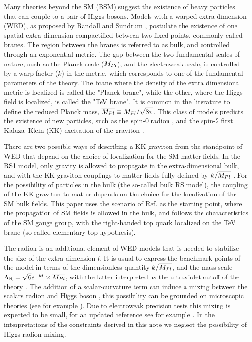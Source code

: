 Many theories beyond the SM (BSM) suggest \ifdefined{}\else{ } \fi the existence of heavy particles that can couple to a pair of Higgs bosons. 
Models with a warped extra dimension 
(WED), as proposed by Randall and Sundrum \cite{Randall:1999ee}, postulate the existence of one spatial extra dimension compactified between two fixed points, commonly called branes. The region between the branes is referred to as bulk, and controlled through an exponential metric. 
The gap between the two fundamental scales of nature, such as the Planck scale ($M_{Pl}$), and the electroweak scale, is controlled by a warp factor ($k$) in the metric, which corresponds to one of the fundamental parameters of  the theory. The brane where the density of the extra dimensional metric is localized is called the "Planck brane", while the other, where the Higgs field is localized, is called the "TeV brane". It is common in the 
literature to define the reduced Planck mass, $\overline{M_{Pl}} \equiv M_{Pl} /\sqrt{8\pi}$. 
This class of models predicts the existence of new particles, such as the spin-0 radion \cite{Goldberger:1999uk,DeWolfe:1999cp,Csaki:1999mp}, and the spin-2 
first Kaluza--Klein (KK) excitation of the graviton \cite{Davoudiasl:1999jd,Csaki:2000zn, Agashe:2007zd}. 

There are two possible ways of describing a KK graviton from the standpoint of WED that depend on the choice of localization for the SM matter fields. In the RS1 model, only gravity is allowed to propagate in the extra-dimensional bulk, and with the KK-graviton couplings to matter fields fully defined by $k/\overline{M_{Pl}}$ \cite{Randall:1999ee}. For the possibility of particles in the bulk (the so-called bulk RS model), the coupling of the KK graviton to matter depends on the choice for the localization of the SM bulk fields. This paper uses the scenario of Ref. \cite{Fitzpatrick:2007qr} as the starting point, where the propagation of SM fields is allowed in the bulk, and follows the characteristics of the SM gauge group, with the right-handed top quark localized on the TeV brane (so called elementary top hypothesis). 

The radion is an additional element of WED models that is needed to stabilize the size of the extra dimension $l$. It is usual to express the benchmark points of the model in terms of the dimensionless quantity $k/\overline{M_{Pl}}$, and the mass scale $\Lambda_{\rm R} = \sqrt{6} e^{-kl}\times \overline{M_{Pl}}$, with the latter interpreted as the ultraviolet cutoff of the theory \cite{Giudice:2000av}. 
The addition of a scalar-curvature term can induce a mixing between the
scalars radion and Higgs boson \cite{Giudice:2000av,Dominici:2002jv}, this possibility can be grounded on microscopic theories (see for example \cite{Antoniadis:2002ut}).
Due to electroweak precision tests this mixing is expected to be small, for an updated reference see for example \cite{Desai:2013pga}.
In the interpretations of the constraints derived in this note we neglect the possibility of Higgs-radion mixing. 


